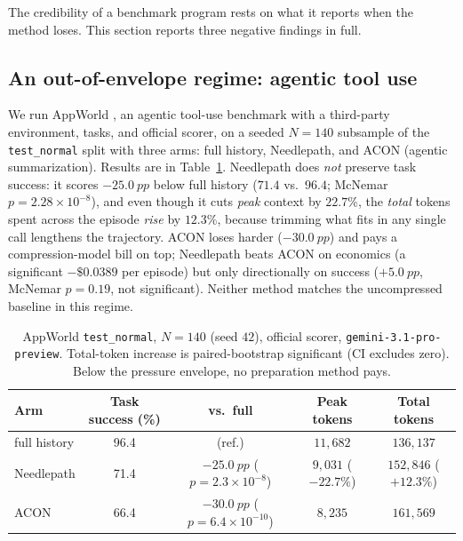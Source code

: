 \documentclass[11pt]{article}
\newcommand{\pp}{~pp}          %
\newcommand{\NP}{Needlepath}
\begin{document}
The credibility of a benchmark program rests on what it reports when the method loses. This
section reports three negative findings in full.

\subsection{An out-of-envelope regime: agentic tool use}
\label{sec:appworld}

We run AppWorld \citep{trivedi2024appworld}, an agentic tool-use benchmark with a third-party
environment, tasks, and official scorer, on a seeded $N{=}140$ subsample of the
\texttt{test\_normal} split with three arms: full history, \NP{}, and ACON (agentic
summarization). Results are in Table~\ref{tab:appworld}. \NP{} does \emph{not} preserve task
success: it scores $-25.0\pp$ below full history ($71.4$ vs.\ $96.4$; McNemar $p{=}2.28\times
10^{-8}$), and even though it cuts \emph{peak} context by $22.7\%$, the \emph{total} tokens spent
across the episode \emph{rise} by $12.3\%$, because trimming what fits in any single call
lengthens the trajectory. ACON loses harder ($-30.0\pp$) and pays a compression-model bill on top;
\NP{} beats ACON on economics (a significant $-\$0.0389$ per episode) but only directionally on
success ($+5.0\pp$, McNemar $p{=}0.19$, not significant). Neither method matches the uncompressed
baseline in this regime.

\begin{table}[t]
\centering
\small
\begin{tabular}{@{}lcccc@{}}
\toprule
Arm & Task success (\%) & vs.\ full & Peak tokens & Total tokens \\
\midrule
full history & 96.4 & (ref.) & $11{,}682$ & $136{,}137$ \\
\NP{}        & 71.4 & $-25.0\pp$ ($p{=}2.3\times10^{-8}$) & $9{,}031$ ($-22.7\%$) & $152{,}846$ ($+12.3\%$) \\
ACON         & 66.4 & $-30.0\pp$ ($p{=}6.4\times10^{-10}$) & $8{,}235$ & $161{,}569$ \\
\bottomrule
\end{tabular}
\caption{AppWorld \texttt{test\_normal}, $N{=}140$ (seed $42$), official scorer,
\texttt{gemini-3.1-pro-preview}. Total-token increase is paired-bootstrap significant (CI excludes
zero). Below the pressure envelope, no preparation method pays.}
\label{tab:appworld}
\end{table}
\end{document}
